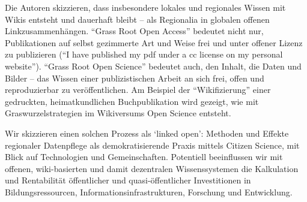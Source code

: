 Die Autoren skizzieren, dass insbesondere lokales und regionales Wissen
mit Wikis entsteht und dauerhaft bleibt -- als Regionalia in globalen
offenen Linkzusammenhängen. ``Grass Root Open Access'' bedeutet nicht
nur, Publikationen auf selbst gezimmerte Art und Weise frei und unter
offener Lizenz zu publizieren (``I have published my pdf under a cc
license on my personal website''). ``Grass Root Open Science'' bedeutet
auch, den Inhalt, die Daten und Bilder -- das Wissen einer
publizistischen Arbeit an sich frei, offen und reproduzierbar zu
veröffentlichen. Am Beispiel der ``Wikifizierung'' einer gedruckten,
heimatkundlichen Buchpublikation wird gezeigt, wie mit
Graswurzelstrategien im Wikiversums Open Science entsteht.

Wir skizzieren einen solchen Prozess als `linked open': Methoden und
Effekte regionaler Datenpflege als demokratisierende Praxis mittels
Citizen Science, mit Blick auf Technologien und Gemeinschaften.
Potentiell beeinflussen wir mit offenen, wiki-basierten und damit
dezentralen Wissenssystemen die Kalkulation und Rentabilität
öffentlicher und quasi-öffentlicher Investitionen in Bildungsressourcen,
Informationsinfrastrukturen, Forschung und Entwicklung.
